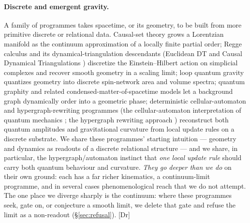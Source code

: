 \documentclass[10pt,twocolumn]{article}
\theoremstyle{definition}
\newcommand{\Dr}{\textsf{[Dr]}}
\begin{document}
\paragraph{Discrete and emergent gravity.} A family of programmes takes spacetime, or its
geometry, to be built from more primitive discrete or relational data. Causal-set theory
\cite{bombelli1987,surya2019} grows a Lorentzian manifold as the continuum approximation of
a locally finite partial order; Regge calculus \cite{regge1961} and its
dynamical-triangulation descendants (Euclidean DT and Causal Dynamical Triangulations
\cite{cdt2005}) discretize the Einstein--Hilbert action on simplicial
complexes and recover smooth geometry in a scaling limit; loop quantum gravity
\cite{rovellismolin1990} quantizes geometry into discrete spin-network
\cite{penrose1971} area and volume spectra; quantum graphity \cite{graphity2008} and related
condensed-matter-of-spacetime models let a background graph dynamically order into a
geometric phase; deterministic cellular-automaton and hypergraph-rewriting programmes
(the cellular-automaton interpretation of quantum mechanics \cite{thooftca2016}; the
hypergraph rewriting approach \cite{wolfram2020}) reconstruct both quantum amplitudes and
gravitational curvature from local update rules on a discrete substrate. We share these programmes' starting intuition ---
geometry and dynamics as readouts of a discrete relational structure --- and we share, in
particular, the hypergraph/automaton instinct that \emph{one local update rule} should
carry both quantum behaviour and curvature. \emph{They go deeper than we do} on their own
ground: each has a far richer kinematics, a continuum-limit programme, and in several
cases phenomenological reach that we do not attempt. The one place we diverge sharply is
the continuum: where these programmes seek, gate on, or conjecture a smooth limit, we
delete that gate and refuse the limit as a non-readout (\S\ref{sec:refusal}). \Dr{}
\end{document}
